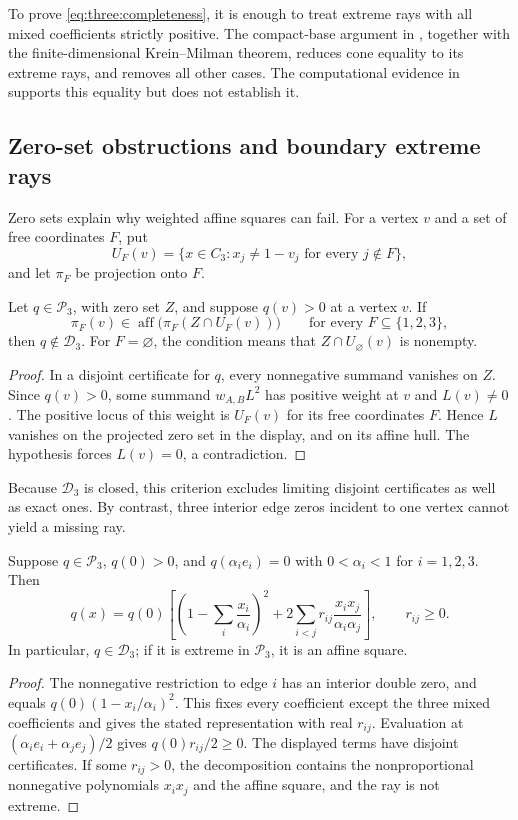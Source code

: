 To prove \eqref{eq:three:completeness}, it is enough to treat extreme rays
with all mixed coefficients strictly positive. The compact-base argument
in , together with the finite-dimensional
Krein--Milman theorem, reduces cone equality to its extreme rays, and
 removes all other cases. The computational evidence
in  supports this equality but does not establish it.

\subsection{Zero-set obstructions and boundary extreme rays}

Zero sets explain why weighted affine squares can fail. For a vertex $v$
and a set of free coordinates $F$, put
\[
 U_F(v)=\{x\in C_3:x_j\ne1-v_j\text{ for every }j\notin F\},
\]
and let $\pi_F$ be projection onto $F$.

\begin{lemma}\label{three:blocking}
Let $q\in\mathcal P_3$, with zero set $Z$, and suppose $q(v)>0$ at a
vertex $v$. If
\[
 \pi_F(v)\in\operatorname{aff}\bigl(\pi_F(Z\cap U_F(v))\bigr)
 \qquad\text{for every }F\subseteq\{1,2,3\},
\]
then $q\notin \mathcal D_3$. For $F=\varnothing$, the condition means that
$Z\cap U_\varnothing(v)$ is nonempty.
\end{lemma}
\begin{proof}
In a disjoint certificate for $q$, every nonnegative summand vanishes on
$Z$. Since $q(v)>0$, some summand $w_{A,B}L^2$ has positive weight at $v$
and $L(v)\ne0$. The positive locus of this weight is $U_F(v)$ for its
free coordinates $F$. Hence $L$ vanishes on the projected zero set in the
display, and on its affine hull. The hypothesis forces $L(v)=0$, a
contradiction.
\end{proof}

Because $\mathcal D_3$ is closed, this criterion excludes limiting disjoint
certificates as well as exact ones. By contrast, three interior edge zeros
incident to one vertex cannot yield a missing ray.

\begin{lemma}\label{three:three-edges}
Suppose $q\in\mathcal P_3$, $q(0)>0$, and
$q(\alpha_i e_i)=0$ with $0<\alpha_i<1$ for $i=1,2,3$. Then
\[
 q(x)=q(0)\left[
       \left(1-\sum_i\frac{x_i}{\alpha_i}\right)^2
       +2\sum_{i<j}r_{ij}\frac{x_ix_j}{\alpha_i\alpha_j}\right],
 \qquad r_{ij}\ge0.
\]
In particular, $q\in \mathcal D_3$; if it is extreme in $\mathcal P_3$, it is an
affine square.
\end{lemma}
\begin{proof}
The nonnegative restriction to edge $i$ has an interior double zero, and
equals $q(0)(1-x_i/\alpha_i)^2$. This fixes every coefficient except the
three mixed coefficients and gives the stated representation with real
$r_{ij}$. Evaluation at
$(\alpha_i e_i+\alpha_j e_j)/2$ gives $q(0)r_{ij}/2\ge0$. The displayed
terms have disjoint certificates. If some $r_{ij}>0$, the decomposition
contains the nonproportional nonnegative polynomials $x_ix_j$ and the
affine square, and the ray is not extreme.
\end{proof}

